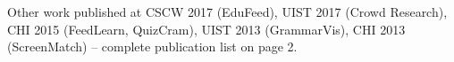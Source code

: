 \documentclass[margin,line]{resume}
\begin{document}
\begin{resume}
\vspace{-2mm}

Other work published at CSCW 2017 (EduFeed), UIST 2017 (Crowd Research), CHI 2015 (FeedLearn, QuizCram), UIST 2013 (GrammarVis), CHI 2013 (ScreenMatch) -- complete publication list on page 2.\\


%

\end{resume}
\end{document}

